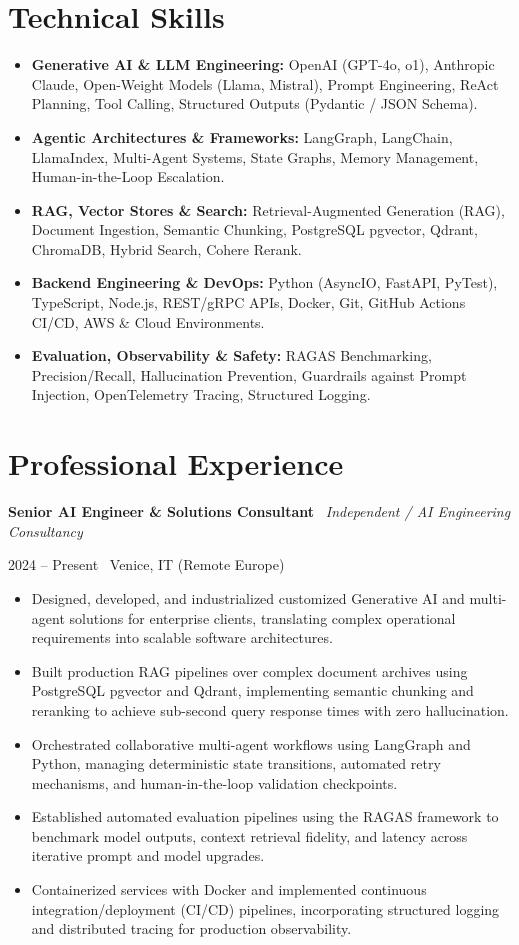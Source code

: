 \documentclass[a4paper,10pt]{article}
\newcommand{\role}[4]{%
  \vspace{2pt}\noindent
  \begin{minipage}[t]{0.70\textwidth}\raggedright\textbf{#1} \textbullet\ \textit{#3}\end{minipage}%
  \hfill
  \begin{minipage}[t]{0.28\textwidth}\raggedleft\footnotesize\color{gray}#2 \textbullet\ #4\end{minipage}%
  \vspace{1pt}%
}
\begin{document}
\section{Technical Skills}
\begin{itemize}[leftmargin=1.2em, itemsep=2pt]
  \item \textbf{Generative AI \& LLM Engineering:} OpenAI (GPT-4o, o1), Anthropic Claude, Open-Weight Models (Llama, Mistral), Prompt Engineering, ReAct Planning, Tool Calling, Structured Outputs (Pydantic / JSON Schema).
  \item \textbf{Agentic Architectures \& Frameworks:} LangGraph, LangChain, LlamaIndex, Multi-Agent Systems, State Graphs, Memory Management, Human-in-the-Loop Escalation.
  \item \textbf{RAG, Vector Stores \& Search:} Retrieval-Augmented Generation (RAG), Document Ingestion, Semantic Chunking, PostgreSQL pgvector, Qdrant, ChromaDB, Hybrid Search, Cohere Rerank.
  \item \textbf{Backend Engineering \& DevOps:} Python (AsyncIO, FastAPI, PyTest), TypeScript, Node.js, REST/gRPC APIs, Docker, Git, GitHub Actions CI/CD, AWS \& Cloud Environments.
  \item \textbf{Evaluation, Observability \& Safety:} RAGAS Benchmarking, Precision/Recall, Hallucination Prevention, Guardrails against Prompt Injection, OpenTelemetry Tracing, Structured Logging.
\end{itemize}

\section{Professional Experience}

\role{Senior AI Engineer \& Solutions Consultant}{2024 -- Present}{Independent / AI Engineering Consultancy}{Venice, IT (Remote Europe)}
\begin{itemize}
  \item Designed, developed, and industrialized customized Generative AI and multi-agent solutions for enterprise clients, translating complex operational requirements into scalable software architectures.
  \item Built production RAG pipelines over complex document archives using PostgreSQL pgvector and Qdrant, implementing semantic chunking and reranking to achieve sub-second query response times with zero hallucination.
  \item Orchestrated collaborative multi-agent workflows using LangGraph and Python, managing deterministic state transitions, automated retry mechanisms, and human-in-the-loop validation checkpoints.
  \item Established automated evaluation pipelines using the RAGAS framework to benchmark model outputs, context retrieval fidelity, and latency across iterative prompt and model upgrades.
  \item Containerized services with Docker and implemented continuous integration/deployment (CI/CD) pipelines, incorporating structured logging and distributed tracing for production observability.
\end{itemize}
\end{document}
